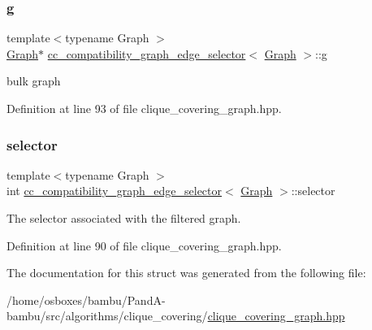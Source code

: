 \subsubsection{\texorpdfstring{g}{g}}
{\footnotesize\ttfamily template$<$typename Graph $>$ \\
\hyperlink{structGraph}{Graph}$\ast$ \hyperlink{structcc__compatibility__graph__edge__selector}{cc\+\_\+compatibility\+\_\+graph\+\_\+edge\+\_\+selector}$<$ \hyperlink{structGraph}{Graph} $>$\+::g\hspace{0.3cm}{\ttfamily [private]}}



bulk graph 



Definition at line 93 of file clique\+\_\+covering\+\_\+graph.\+hpp.

\mbox{\label{structcc__compatibility__graph__edge__selector_a1f76a7b1a5eff2f63722f283f3d12e26}} 
\subsubsection{\texorpdfstring{selector}{selector}}
{\footnotesize\ttfamily template$<$typename Graph $>$ \\
int \hyperlink{structcc__compatibility__graph__edge__selector}{cc\+\_\+compatibility\+\_\+graph\+\_\+edge\+\_\+selector}$<$ \hyperlink{structGraph}{Graph} $>$\+::selector\hspace{0.3cm}{\ttfamily [private]}}



The selector associated with the filtered graph. 



Definition at line 90 of file clique\+\_\+covering\+\_\+graph.\+hpp.



The documentation for this struct was generated from the following file\+:\begin{DoxyCompactItemize}
\item 
/home/osboxes/bambu/\+Pand\+A-\/bambu/src/algorithms/clique\+\_\+covering/\hyperlink{clique__covering__graph_8hpp}{clique\+\_\+covering\+\_\+graph.\+hpp}\end{DoxyCompactItemize}
